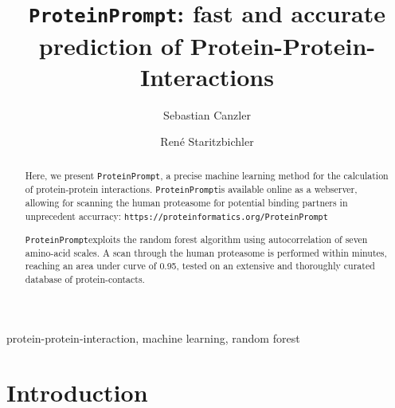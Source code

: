 \documentclass[preprint,3p,times,twocolumn]{elsarticle}
\newcommand{\url}[1]{\texttt{https://\small #1}}
\newcommand{\tool}{\texttt{ProteinPrompt}\hspace{2pt}}
\newcommand{\website}{\url{proteinformatics.org/\tool}}
\begin{document}
\begin{frontmatter}
   
\title{\tool: fast and accurate prediction of Protein-Protein-Interactions}

\author[LEI,IMT]{Sebastian Canzler}
\author[PHY,IMT]{Ren\'{e} Staritzbichler}


\address[LEI]{Bioinformatics Group, Department of Computer Science,
  University of Leipzig,
  H{\"a}rtelstra{\ss}e 16-18, 04107 Leipzig, Germany
}
\address[PHY]{ProteinFormatics Group, Institute of Medical Physics and Biophysics, University of Leipzig,
  H{\"a}rtelstra{\ss}e 16-18, 04107 Leipzig, Germany.}

\address[IMT]{Immuthera GmbH, L{\"o}{\ss}niger Stra{\ss}e 16, 04275 Leipzig, Germany.}



 

\begin{abstract}

  Here, we present \tool, a precise machine learning method for the calculation of protein-protein interactions.
  \tool  is available online as a webserver, allowing for scanning the human proteasome for potential binding partners in unprecedent accurracy:
  \website

  \tool exploits the random forest algorithm using autocorrelation of seven amino-acid scales.
  A scan through the human proteasome is performed within minutes, reaching an area under curve of 0.95, tested on an extensive and thoroughly curated database of protein-contacts.
  
\end{abstract}

\begin{keyword}
  protein-protein-interaction, machine learning, random forest
\end{keyword}

\end{frontmatter}


\section{Introduction}
\end{document}
